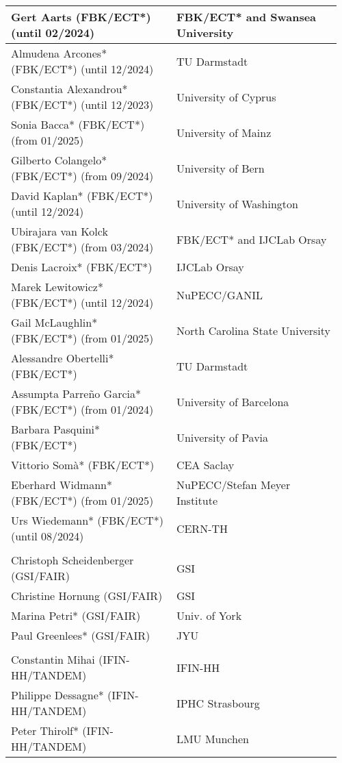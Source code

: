\begin{longtable}{|L{0.48\linewidth}|C{0.48\linewidth}|}
Gert Aarts (FBK/ECT*)  (until 02/2024)  & FBK/ECT* and Swansea University \\ \hline
Almudena Arcones* (FBK/ECT*)  (until 12/2024) &  TU Darmstadt \\ \hline
Constantia Alexandrou* (FBK/ECT*)  (until 12/2023) & University of Cyprus \\ \hline
Sonia Bacca* (FBK/ECT*)  (from 01/2025) &  University of Mainz \\ \hline
Gilberto Colangelo* (FBK/ECT*) (from 09/2024) & University of Bern\\ \hline
David Kaplan* (FBK/ECT*)  (until 12/2024) & University of Washington \\ \hline
Ubirajara van Kolck (FBK/ECT*)  (from 03/2024)  & FBK/ECT* and IJCLab Orsay \\ \hline   
Denis Lacroix* (FBK/ECT*)  & IJCLab Orsay \\ \hline
Marek Lewitowicz* (FBK/ECT*)  (until 12/2024)  & NuPECC/GANIL \\ \hline
Gail McLaughlin* (FBK/ECT*)  (from 01/2025) & North Carolina State University \\ \hline
Alessandre Obertelli* (FBK/ECT*)    & TU Darmstadt \\ \hline
Assumpta Parre\~no Garcia* (FBK/ECT*) (from 01/2024) & University of Barcelona \\ \hline
Barbara Pasquini* (FBK/ECT*)    & University of Pavia \\ \hline
Vittorio Somà* (FBK/ECT*)    & CEA Saclay \\ \hline
Eberhard Widmann* (FBK/ECT*) (from 01/2025) & NuPECC/Stefan Meyer Institute\\ \hline
Urs Wiedemann* (FBK/ECT*)  (until 08/2024) & CERN-TH \\ \hline

      \\ \hline
    Christoph Scheidenberger (GSI/FAIR)	& GSI \\ \hline
    Christine Hornung (GSI/FAIR)	& GSI \\ \hline
    Marina Petri* (GSI/FAIR)	& Univ. of York \\ \hline
    Paul Greenlees* (GSI/FAIR)	& JYU \\ \hline

      \\ \hline
    Constantin Mihai (IFIN-HH/TANDEM)	& IFIN-HH \\ \hline
    Philippe Dessagne*  (IFIN-HH/TANDEM)	& IPHC Strasbourg \\ \hline
    Peter Thirolf*  (IFIN-HH/TANDEM)	& LMU Munchen \\ \hline


\end{longtable}
